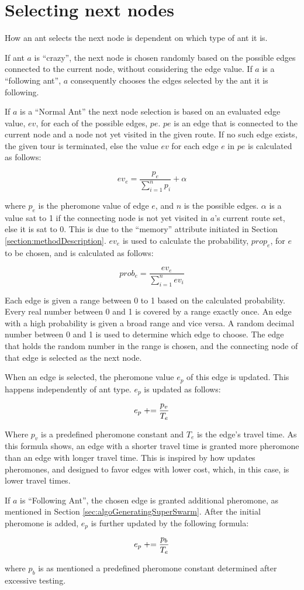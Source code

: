 \section{Selecting next nodes}
\label{sec:selectingNextNode}

How an ant selects the next node is dependent on which type of ant it is. 

If ant $a$ is ``crazy'', the next node is chosen randomly based on the possible edges connected to the current node, without considering the edge value. If $a$ is a ``following ant'', $a$ consequently chooses the edges selected by the ant it is following.  

If $a$ is a ``Normal Ant'' the next node selection is based on an evaluated edge value, $ev$, for each of the possible edges, $pe$. $pe$ is an edge that is connected to the current node and a node not yet visited in the given route. If no such edge exists, the given tour is terminated, else the value $ev$ for each edge $e$ in $pe$ is calculated as follows: 

$$ev_e = \frac{p_e}{\sum\limits^{n}_{i=1}p_i} + \alpha $$

where $p_e$ is the pheromone value of edge $e$, and $n$ is the possible edges. $\alpha$ is a value sat to 1 if the connecting node is not yet visited in $a$'s current route set, else it is sat to 0. This is due to the ``memory'' attribute initiated in Section \vref{section:methodDescription}. $ev_e$ is used to calculate the probability, $prop_e$, for $e$ to be chosen, and is calculated as follows:

$$prob_e = \frac{ev_e}{\sum\limits^{n}_{i=1}ev_i}$$

Each edge is given a range between 0 to 1 based on the calculated probability. Every real number between 0 and 1 is covered by a range exactly once. An edge with a high probability is given a broad range and vice versa. A random decimal number between 0 and 1 is used to determine which edge to choose. The edge that holds the random number in the range is chosen, and the connecting node of that edge is selected as the next node. 

When an edge is selected, the pheromone value $e_p$ of this edge is updated. This happens independently of ant type. $e_p$ is updated as follows:

$$e_p \mathrel{+}= \frac{p_v}{T_e}$$ 

Where $p_v$ is a predefined pheromone constant and $T_e$ is the edge's travel time. As this formula shows, an edge with a shorter travel time is granted more pheromone than an edge with longer travel time. This is inspired by how \citet{hsiao04} updates pheromones, and designed to favor edges with lower cost, which, in this case, is lower travel times. 

If $a$ is ``Following Ant'', the chosen edge is granted additional pheromone, as mentioned in Section \vref{sec:algoGeneratingSuperSwarm}. After the initial pheromone is added, $e_p$ is further updated by the following formula:

$$e_p \mathrel{+}= \frac{p_b}{T_e}$$ 

where $p_b$ is as mentioned a predefined pheromone constant determined after excessive testing.
